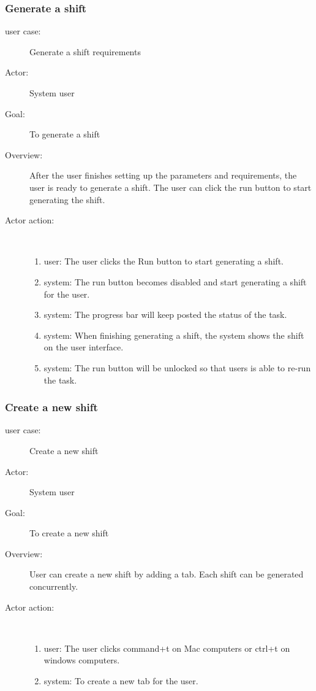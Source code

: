 \documentclass[11pt, oneside]{article}   	%
\begin{document}
\subsubsection{Generate a shift}
\begin{description}
\item[user case:] Generate a shift requirements
\item[Actor:] System user
\item[Goal:] To generate a shift
\item[Overview:]After the user finishes setting up the parameters and requirements, the user is ready to generate a shift. The user can click the run button to start generating the shift.
\item[Actor action:]
\
\begin{enumerate}
\item user: The user clicks the Run button to start generating a shift.
\item system: The run button becomes disabled and start generating a shift for the user.
\item system: The progress bar will keep posted the status of the task.
\item system: When finishing generating a shift, the system shows the shift on the user interface.
\item system: The run button will be unlocked so that users is able to re-run the task.
\end{enumerate}
\end{description}
\subsubsection{Create a new shift}
\begin{description}
\item[user case:] Create a new shift
\item[Actor:] System user
\item[Goal:] To create a new shift
\item[Overview:] User can create a new shift by adding a tab. Each shift can be generated concurrently. 
\item[Actor action:]
\
\begin{enumerate}
\item user: The user clicks command+t on Mac computers or ctrl+t on windows computers.
\item system: To create a new tab for the user.
\end{enumerate}
\end{description}
\end{document}

